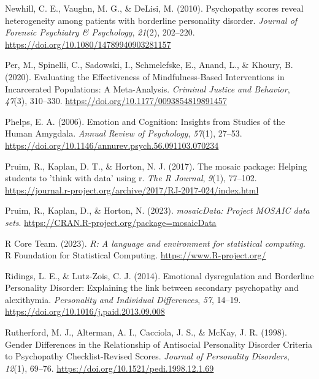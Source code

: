 \documentclass[
  man,floatsintext]{apa7}
\newlength{\cslhangindent}
\newlength{\cslentryspacingunit} %
\newenvironment{CSLReferences}[2] %
 {%
  \setlength{\parindent}{0pt}
  \ifodd #1
  \let\oldpar\par
  \def\par{\hangindent=\cslhangindent\oldpar}
  \fi
  \setlength{\parskip}{#2\cslentryspacingunit}
 }%
 {}
\begin{document}
\begin{CSLReferences}{1}{0}
\leavevmode{}%
Newhill, C. E., Vaughn, M. G., \& DeLisi, M. (2010). Psychopathy scores reveal heterogeneity among patients with borderline personality disorder. \emph{Journal of Forensic Psychiatry \& Psychology}, \emph{21}(2), 202--220. \url{https://doi.org/10.1080/14789940903281157}

\leavevmode{}%
Per, M., Spinelli, C., Sadowski, I., Schmelefske, E., Anand, L., \& Khoury, B. (2020). Evaluating the {Effectiveness} of {Mindfulness-Based Interventions} in {Incarcerated Populations}: {A Meta-Analysis}. \emph{Criminal Justice and Behavior}, \emph{47}(3), 310--330. \url{https://doi.org/10.1177/0093854819891457}

\leavevmode{}%
Phelps, E. A. (2006). Emotion and {Cognition}: {Insights} from {Studies} of the {Human Amygdala}. \emph{Annual Review of Psychology}, \emph{57}(1), 27--53. \url{https://doi.org/10.1146/annurev.psych.56.091103.070234}

\leavevmode{}%
Pruim, R., Kaplan, D. T., \& Horton, N. J. (2017). The mosaic package: Helping students to 'think with data' using r. \emph{The R Journal}, \emph{9}(1), 77--102. \url{https://journal.r-project.org/archive/2017/RJ-2017-024/index.html}

\leavevmode{}%
Pruim, R., Kaplan, D., \& Horton, N. (2023). \emph{mosaicData: Project MOSAIC data sets}. \url{https://CRAN.R-project.org/package=mosaicData}

\leavevmode{}%
R Core Team. (2023). \emph{R: A language and environment for statistical computing}. R Foundation for Statistical Computing. \url{https://www.R-project.org/}

\leavevmode{}%
Ridings, L. E., \& Lutz-Zois, C. J. (2014). Emotional dysregulation and {Borderline Personality Disorder}: {Explaining} the link between secondary psychopathy and alexithymia. \emph{Personality and Individual Differences}, \emph{57}, 14--19. \url{https://doi.org/10.1016/j.paid.2013.09.008}

\leavevmode{}%
Rutherford, M. J., Alterman, A. I., Cacciola, J. S., \& McKay, J. R. (1998). Gender {Differences} in the {Relationship} of {Antisocial Personality Disorder Criteria} to {Psychopathy Checklist-Revised Scores}. \emph{Journal of Personality Disorders}, \emph{12}(1), 69--76. \url{https://doi.org/10.1521/pedi.1998.12.1.69}


\end{CSLReferences}
\end{document}
